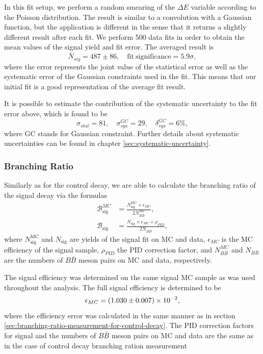 In this fit setup, we perform a random smearing of the $\Delta E$ variable according to the Poisson distribution. The result is similar to a convolution with a Gaussian function, but the application is different in the sense that it returns a slightly different result after each fit. We perform 500 data fits in order to obtain the mean values of the signal yield and fit error. The averaged result is
\begin{equation*}
\bar N {}_{sig} = 487 \pm 86,\quad \mathrm{fit~significance} = 5.9\sigma,
\end{equation*}
where the error represents the joint value of the statistical error as well as the systematic error of the Gaussian constraints used in the fit. This means that our initial fit is a good representation of the average fit result. 

It is possible to estimate the contribution of the systematic uncertainty to the fit error above, which is found to be
\begin{equation}
\sigma_{stat} = 81,\quad \sigma_{sys}^{GC} = 29,\quad \delta_{sys}^{GC} = 6\%,
\end{equation}
where GC stands for Gaussian constraint. Further details about systematic uncertainties can be found in chapter \ref{sec:systematic-uncertainty}.

\subsubsection{Branching Ratio}\label{sec:branching-ratio-calculation-for-signal-decay}

Similarly as for the control decay, we are able to calculate the branching ratio of the signal decay via the formulas
\begin{align}
\mathcal{B}^{MC}_{\mathrm{sig}} &= \frac{N^{\mathrm{MC}}_\mathrm{sig} \times \epsilon_{MC}}{2N_{B\bar B}^{MC}},\\
\mathcal{B}_{\mathrm{sig}} &= \frac{N_\mathrm{sig} \times \epsilon_{MC} \times \rho_{PID}}{2N_{B\bar B}},
\label{eq:br_data_sig}
\end{align}
where $N^{\mathrm{MC}}_\mathrm{sig}$ and $N_\mathrm{sig}$ are yields of the signal fit on MC and data, $\epsilon_{MC}$ is the MC efficiency of the signal sample, $\rho_{PID}$ the PID correction factor, and $N_{B\bar B}^{MC}$ and $N_{B\bar B}$ are the numbers of $B \bar B$ meson pairs on MC and data, respectively.

The signal efficiency was determined on the same signal MC sample as was used throughout the analysis. The full signal efficiency is determined to be
\begin{equation*}
\epsilon_{MC} = (1.030 \pm 0.007)\times 10^{-2},
\end{equation*}
where the efficiency error was calculated in the same manner as in section \ref{sec:branching-ratio-measurement-for-control-decay}. The PID correction factors for signal and the numbers of $B\bar B$ meson pairs on MC and data are the same as in the case of control decay branching ration measurement

